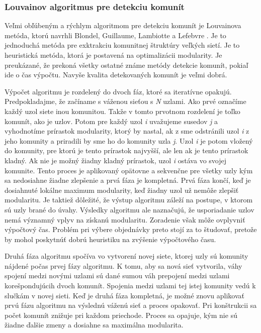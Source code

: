 \documentclass[slovak,master,public,dept460,male,cpdeclaration,oneside]{diploma}
\begin{document}
\subsubsection{Louvainov algoritmus pre detekciu komunít}

Veľmi obľúbeným a rýchlym algoritmom pre detekciu komunít je Louvainova metóda, ktorú navrhli Blondel, Guillaume, Lambiotte a Lefebvre \cite{12}. Je to jednoduchá metóda pre exktrakciu komunitnej štruktúry veľkých sietí. Je to heuristická metóda, ktorá je postavená na optimalizácii modularity. Je preukázané, že prekoná všetky ostatné známe metódy detekcie komunít, pokiaľ ide o čas výpočtu. Navyše kvalita detekovaných komunít je veľmi dobrá.


Výpočet algoritmu je rozdelený do dvoch fáz, ktoré sa iteratívne opakujú. Predpokladajme, že začíname s váženou sieťou s \textit{N} uzlami. Ako prvé označíme každý uzol siete inou komunitou. Takže v tomto prvotnom rozdelení je toľko komunít, ako je uzlov. Potom pre každý uzol \textit{i} uvažujeme susedov \textit{j} a vyhodnotíme prírastok modularity, ktorý by nastal, ak z sme odstránili uzol \textit{i} z jeho komunity a priradili by sme ho do komunity uzla \textit{j}. Uzol \textit{i} je potom vložený do komunity, pre ktorú je tento prírastok najvyšší, ale len ak je tento prírastok kladný. Ak nie je možný žiadny kladný prírastok, uzol \textit{i} ostáva vo svojej komunite. Tento proces je aplikovaný opätovne a sekvenčne pre všetky uzly kým sa nedosiahne žiadne zlepšenie a prvá fáza je kompletná. Prvá fáza končí, keď je dosiahnuté lokálne maximum modularity, keď žiadny uzol už nemôže zlepšiť modularitu. Je taktiež dôležité, že výstup algoritmu záleží na postupe, v ktorom sú uzly brané do úvahy. Výsledky algoritmu ale naznačujú, že usporiadanie uzlov nemá významný vplyv na získanú modularitu. Zoradenie však môže ovplyvniť výpočtový čas. Problém pri výbere objednávky preto stojí za to študovať, pretože by mohol poskytnúť dobrú heuristiku na zvýšenie výpočtového času.


Druhá fáza algoritmu spočíva vo vytvorení novej siete, ktorej uzly sú komunity nájdené počas prvej fázy algoritmu. K tomu, aby sa nová sieť vytvorila, váhy spojení medzi novými uzlami sú dané sumou váh prepojení medzi uzlami korešpondujúcih dvoch komunít. Spojenia medzi uzlami tej istej komunity vedú k slučkám v novej sieti. Keď je druhá fáza kompletná, je možné znovu aplikovať prvú fázu algoritmu na výslednú váženú sieť a proces opakovať. Pri konštrukcii sa počet komunít znižuje pri každom priechode. Proces sa opajuje, kým nie sú žiadne ďalšie zmeny a dosiahne sa maximálna modularita.
\end{document}

